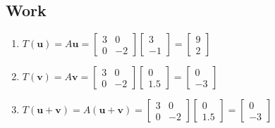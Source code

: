 \documentclass{article}
\begin{document}
    \subsection{Work}
        \begin{enumerate}
            \item 
                $T(\mathbf{u}) = A\mathbf{u} = \begin{bmatrix}3 & 0\\0 & -2\end{bmatrix}\begin{bmatrix}3\\-1\end{bmatrix} = \begin{bmatrix}9\\2\end{bmatrix}$
            \item 
                $T(\mathbf{v}) = A\mathbf{v} = \begin{bmatrix}3 & 0\\0 & -2\end{bmatrix}\begin{bmatrix}0\\1.5\end{bmatrix} = \begin{bmatrix}0\\-3\end{bmatrix}$
            \item 
                $T(\mathbf{u}+\mathbf{v}) = A(\mathbf{u}+\mathbf{v}) = \begin{bmatrix}3 & 0\\0 & -2\end{bmatrix}\begin{bmatrix}0\\1.5\end{bmatrix} = \begin{bmatrix}0\\-3\end{bmatrix}$
        \end{enumerate}
\end{document}
